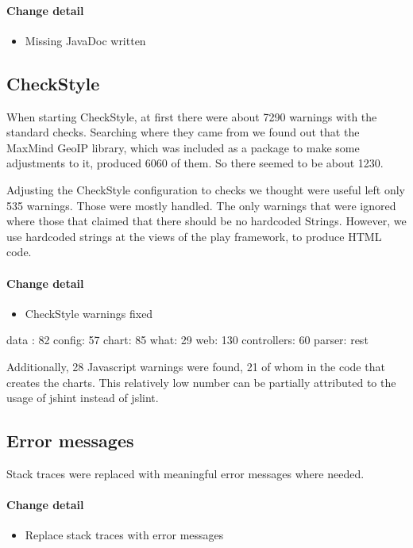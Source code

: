 \paragraph{Change detail}
\begin{itemize}
  \item Missing JavaDoc written
\end{itemize}

\subsection{CheckStyle}\label{cs} %
When starting CheckStyle, at first there were about 7290 warnings with the standard checks.
Searching where they came from we found out that the MaxMind GeoIP library, 
which was included as a package to make some adjustments to it, produced 6060 of them. So there seemed to be about
1230.

Adjusting the CheckStyle configuration to checks we thought were useful left only 535 warnings.
Those were mostly handled. The only warnings that were ignored where those that claimed that there should be no hardcoded Strings.
However, we use hardcoded strings at the views of the play framework, to produce HTML code.

\paragraph{Change detail}
\begin{itemize}
  \item CheckStyle warnings fixed
\end{itemize}
data : 82
config: 57
chart: 85
what: 29
web: 130
controllers: 60 
parser: rest

Additionally, 28 Javascript warnings were found, 21 of whom in the code that creates the charts.
This relatively low number can be partially attributed to the usage of jshint instead of jslint.

\subsection{Error messages}
Stack traces were replaced with meaningful error messages where needed.
\paragraph{Change detail}
\begin{itemize}
  \item Replace stack traces with error messages
\end{itemize}

 
